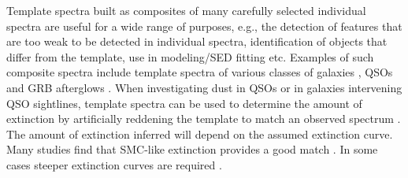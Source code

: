 \documentclass{aa}    %
\begin{document}
Template spectra built as composites of many carefully selected individual spectra
are useful for a wide range of purposes, e.g., the detection
of features that are too weak to be detected in individual spectra,
identification of objects that differ from the template, use in modeling/SED fitting etc. Examples of such composite spectra include template spectra of various classes of galaxies \citep{Mannucci2001, Shapley2003, Dobos2012}, QSOs \citep{CristianiS.andVio1990, Boyle1990, Francis1991, Zheng1997, Brotherton2000, VandenBerk2001, Telfer2002, Richards2006a, Glikman2006, Lusso2015} and GRB afterglows \citep{Christensen2011}. 
When investigating dust in QSOs or in galaxies intervening QSO sightlines, template spectra can be used to determine the
amount of extinction by artificially reddening the template 
to match an observed spectrum \citep[e.g.,][]{Glikman2007,Urrutia2009,Wang2012,Fynbo2013,Krogager2015}. 
The amount of extinction inferred will depend on the
assumed extinction curve. Many studies find that SMC-like extinction provides
a good match \citep{Richards2003,Hopkins2004}. In some cases steeper extinction
curves are required \citep{Fynbo2013,Jiang2013,Leighly2014}.
\end{document}
